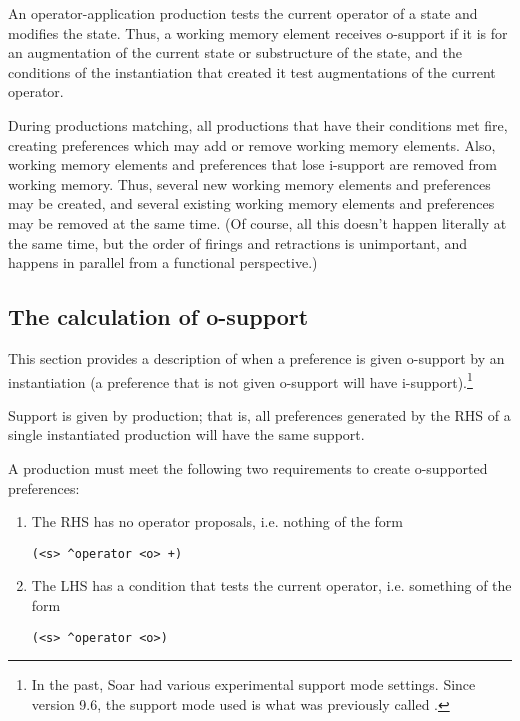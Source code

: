 An operator-application production tests the current operator of a state
and modifies the state. Thus, a working memory element receives
o-support if it is for an augmentation of the current state or
substructure of the state, and the conditions of the instantiation that
created it test augmentations of the current operator.  

During productions matching, all productions that have their conditions
met fire, creating preferences which may add or remove working memory elements. 
Also, working memory elements and preferences that lose i-support are removed 
from working memory. Thus, several new working memory elements and preferences
may be created, and several existing working memory elements and preferences 
may be removed at the same time. (Of course, all this doesn’t happen literally 
at the same time, but the order of firings and retractions is unimportant, 
and happens in parallel from a functional perspective.)

\subsection{The calculation of o-support}
\label{SUPPORT}

This section provides a description of when a preference is given o-support by an instantiation (a preference that is not given o-support will have i-support).\footnote{In the past, Soar had various experimental support mode settings. Since version 9.6, the support mode used is what was previously called . }

Support is given by production; that is, all preferences generated by the RHS of a single instantiated production will have the same support. 

A production must meet the following two requirements to create o-supported preferences:
\begin{enumerate}
	\item The RHS has no operator proposals, i.e. nothing of the form \begin{verbatim}(<s> ^operator <o> +) \end{verbatim}
	\item The LHS has a condition that tests the current operator, i.e. something of the form
	\begin{verbatim}(<s> ^operator <o>)\end{verbatim}
\end{enumerate}

